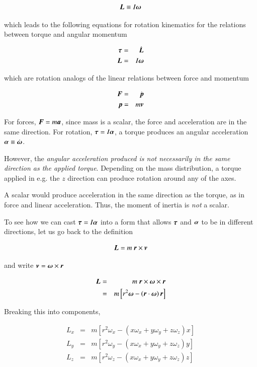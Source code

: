 \begin{equation}
{\boldsymbol{L}} \equiv I {\boldsymbol{\omega}} 
\end{equation}


which leads to the following equations for rotation kinematics for the relations between torque and angular momentum 


\begin{eqnarray}
{\boldsymbol{\tau}} &=& \dot{{\boldsymbol{L}}}\\
{\boldsymbol{L}} &=&I {\boldsymbol{\omega}} 
\end{eqnarray}

which are rotation analogs of the linear relations between force and momentum 

\begin{eqnarray}
{\boldsymbol{F}} &=& \dot{{\boldsymbol{p}}} \\
{\boldsymbol{p}} &=& m {\boldsymbol{v}} 
\end{eqnarray}


For forces, ${\boldsymbol{F}}=m{\boldsymbol{a}}$, since mass is a scalar, the force and acceleration are in the same direction. For rotation, ${\boldsymbol{\tau}} = I{\boldsymbol{\alpha}}$, a torque produces an angular acceleration ${\boldsymbol{\alpha}}\equiv\dot{{\boldsymbol{\omega}}}$. 


However, the {\it angular acceleration produced is not necessarily in the same direction as the applied torque}. Depending on the mass distribution, a torque applied in e.g. the $z$ direction can produce rotation around any of the axes.  

A scalar would produce acceleration in the same direction as the
torque, as in force and linear acceleration. Thus, the moment of
inertia is {\it not} a scalar. 

To see how we can cast ${\boldsymbol{\tau}}=I{\boldsymbol{\alpha}}$ into a form that allows ${\boldsymbol{\tau}}$ and ${\boldsymbol{\alpha}}$ to be in different directions, let us go back to the definition 

\begin{equation}
{\boldsymbol{L}}=m \ {\boldsymbol{r}}\times {\boldsymbol{v}}
\end{equation}

and write ${\boldsymbol{v}} = {\boldsymbol{\omega}}\times{\boldsymbol{r}}$


\begin{eqnarray}
{\boldsymbol{L}} &=& m \ {\boldsymbol{r}}\times {\boldsymbol{\omega}}\times{\boldsymbol{r}}\\
 &=& m \left[r^2{\boldsymbol{\omega}} -  \left({\boldsymbol{r}}\cdot {\boldsymbol{\omega}}\right){\boldsymbol{r}}\right]\\
\end{eqnarray}


Breaking this into components,  

\begin{eqnarray}
L_x &=& m \left[r^2\omega_x -  \left(x\omega_x + y\omega_y + z\omega_z\right)x\right]\\
L_y &=& m \left[r^2\omega_y -  \left(x\omega_x + y\omega_y + z\omega_z\right)y\right]\\
L_z &=& m \left[r^2\omega_z -  \left(x\omega_x + y\omega_y + z\omega_z\right)z\right]
\end{eqnarray}



